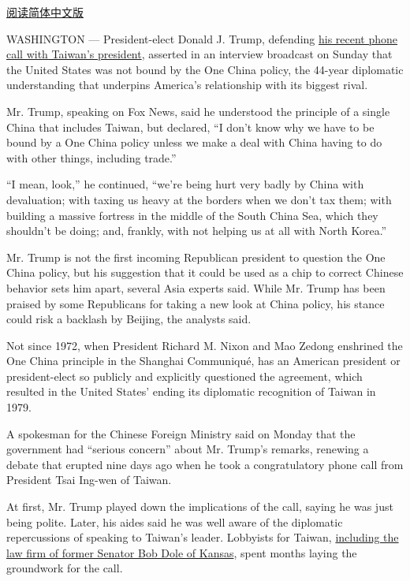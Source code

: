\href{http://cn.nytimes.com/world/20161212/trump-taiwan-one-china/}{阅读简体中文版}

WASHINGTON --- President-elect Donald J. Trump, defending
\href{https://www.nytimes.com/2016/12/02/us/politics/trump-speaks-with-taiwans-leader-a-possible-affront-to-china.html}{his
recent phone call with Taiwan's president}, asserted in an interview
broadcast on Sunday that the United States was not bound by the One
China policy, the 44-year diplomatic understanding that underpins
America's relationship with its biggest rival.

Mr. Trump, speaking on Fox News, said he understood the principle of a
single China that includes Taiwan, but declared, ``I don't know why we
have to be bound by a One China policy unless we make a deal with China
having to do with other things, including trade.''

``I mean, look,'' he continued, ``we're being hurt very badly by China
with devaluation; with taxing us heavy at the borders when we don't tax
them; with building a massive fortress in the middle of the South China
Sea, which they shouldn't be doing; and, frankly, with not helping us at
all with North Korea.''

Mr. Trump is not the first incoming Republican president to question the
One China policy, but his suggestion that it could be used as a chip to
correct Chinese behavior sets him apart, several Asia experts said.
While Mr. Trump has been praised by some Republicans for taking a new
look at China policy, his stance could risk a backlash by Beijing, the
analysts said.

Not since 1972, when President Richard M. Nixon and Mao Zedong enshrined
the One China principle in the Shanghai Communiqué, has an American
president or president-elect so publicly and explicitly questioned the
agreement, which resulted in the United States' ending its diplomatic
recognition of Taiwan in 1979.

A spokesman for the Chinese Foreign Ministry said on Monday that the
government had ``serious concern'' about Mr. Trump's remarks, renewing a
debate that erupted nine days ago when he took a congratulatory phone
call from President Tsai Ing-wen of Taiwan.

At first, Mr. Trump played down the implications of the call, saying he
was just being polite. Later, his aides said he was well aware of the
diplomatic repercussions of speaking to Taiwan's leader. Lobbyists for
Taiwan,
\href{https://www.nytimes.com/2016/12/06/us/politics/bob-dole-taiwan-lobby-trump.html}{including
the law firm of former Senator Bob Dole of Kansas}, spent months laying
the groundwork for the call.


